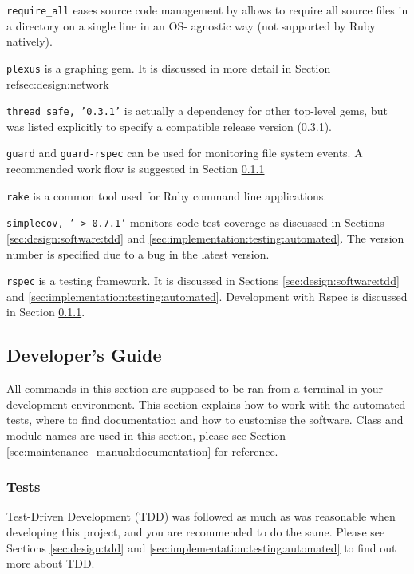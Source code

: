 \texttt{require\_all} \parencite{Require+all} eases source code management by
allows to require all source files in a directory on a single line in an OS-
agnostic way (not supported by Ruby natively).

\texttt{plexus} \parencite{Plexus} is a graphing gem. It is discussed in more
detail in Section ref{sec:design:network}

\texttt{thread\_safe, '0.3.1'} is actually a dependency for other top-level
gems, but was listed explicitly to specify a compatible release version
(0.3.1).

\texttt{guard} and \texttt{guard-rspec} \parencite{Guard} can be used for
monitoring file system events. A recommended work flow is suggested in Section
\ref{sec:maintenance_manual:testing}

\texttt{rake} \parencite{Rake} is a common tool used for Ruby command line
applications.

\texttt{simplecov, '~> 0.7.1'} \parencite{Simplecov} monitors code test
coverage as discussed in Sections \ref{sec:design:software:tdd} and
\ref{sec:implementation:testing:automated}. The version number is specified due
to a bug in the latest version.

\texttt{rspec} \parencite{Rspec} is a testing framework. It is discussed in
Sections \ref{sec:design:software:tdd} and
\ref{sec:implementation:testing:automated}. Development with Rspec is discussed
in Section \ref{sec:maintenance_manual:testing}.


\subsection{Developer's Guide}
\label{sec:maintenance_manual:developing}

All commands in this section are supposed to be ran from a terminal in your
development environment. This section explains how to work with the automated
tests, where to find documentation and how to customise the software. Class and
module names are used in this section, please see Section
\ref{sec:maintenance_manual:documentation} for reference.


\subsubsection{Tests}

\label{sec:maintenance_manual:testing}

Test-Driven Development (TDD) was followed as much as was reasonable when
developing this project, and you are recommended to do the same. Please see
Sections \ref{sec:design:tdd} and \ref{sec:implementation:testing:automated} to
find out more about TDD.

